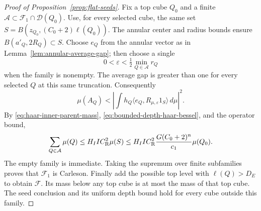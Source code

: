 \begin{proof}[Proof of Proposition~\ref{prop:flat-seeds}]
Fix a top cube $Q_0$ and a finite
$\mathcal A\subset\mathcal F_1\cap\mathcal D(Q_0)$. Use, for every
selected cube, the same set
$S=B(z_{Q_0},(C_0+2)\ell(Q_0))$.
The annular center and radius bounds ensure
$B(a'_Q,2R_Q)\subset S$.
Choose $e_Q$ from the annular vector as in
Lemma~\ref{lem:annular-average-gap}; then choose a single
\[
 0<\varepsilon<\tfrac12\min_{Q\in\mathcal A}r_Q
\]
when the family is nonempty. The average gap is greater than one for
every selected $Q$ at this same truncation. Consequently
\[
 \mu(A_Q)
 <\left|\int h_Q
       \langle e_Q,R_{\mu,\varepsilon}1_S\rangle\,d\mu\right|^2.
\]
By \eqref{eq:haar-inner-parent-mass},
\eqref{eq:bounded-depth-haar-bessel}, and the operator bound,
\[
 \sum_{Q\in\mathcal A}\mu(Q)
 \le H_I I C_{\rm R}^2\mu(S)
 \le H_I I C_{\rm R}^2
       \frac{G(C_0+2)^n}{c_1}\mu(Q_0).
\]
The empty family is immediate. Taking the supremum over finite
subfamilies proves that $\mathcal F_1$ is Carleson. Finally add the possible top level with $\ell(Q)>D_E$ to obtain
$\mathcal F$. Its mass below any top cube is at most the mass of that
top cube. The seed conclusion and its uniform depth bound
hold for every cube outside this family.
\end{proof}
